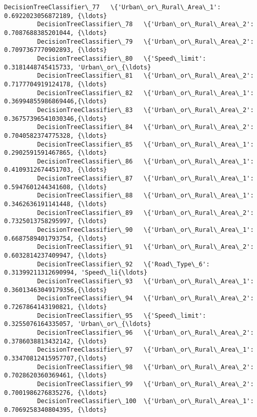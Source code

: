 \documentclass[11pt]{article}
\begin{document}
\begin{Verbatim}[commandchars=\\\{\}]
         DecisionTreeClassifier\_77   \{'Urban\_or\_Rural\_Area\_1': 0.6922023056872189, {\ldots}   
         DecisionTreeClassifier\_78   \{'Urban\_or\_Rural\_Area\_2': 0.7087688385201044, {\ldots}   
         DecisionTreeClassifier\_79   \{'Urban\_or\_Rural\_Area\_2': 0.7097367770902893, {\ldots}   
         DecisionTreeClassifier\_80   \{'Speed\_limit': 0.3181448745415733, 'Urban\_or\_{\ldots}   
         DecisionTreeClassifier\_81   \{'Urban\_or\_Rural\_Area\_2': 0.7177704919124178, {\ldots}   
         DecisionTreeClassifier\_82   \{'Urban\_or\_Rural\_Area\_1': 0.36994855986869446,{\ldots}   
         DecisionTreeClassifier\_83   \{'Urban\_or\_Rural\_Area\_2': 0.36757396541030346,{\ldots}   
         DecisionTreeClassifier\_84   \{'Urban\_or\_Rural\_Area\_2': 0.7040582374775328, {\ldots}   
         DecisionTreeClassifier\_85   \{'Urban\_or\_Rural\_Area\_1': 0.2902591591467865, {\ldots}   
         DecisionTreeClassifier\_86   \{'Urban\_or\_Rural\_Area\_1': 0.4109312674451703, {\ldots}   
         DecisionTreeClassifier\_87   \{'Urban\_or\_Rural\_Area\_1': 0.5947601244341608, {\ldots}   
         DecisionTreeClassifier\_88   \{'Urban\_or\_Rural\_Area\_1': 0.3462636191141448, {\ldots}   
         DecisionTreeClassifier\_89   \{'Urban\_or\_Rural\_Area\_2': 0.7325013758295997, {\ldots}   
         DecisionTreeClassifier\_90   \{'Urban\_or\_Rural\_Area\_1': 0.6687589401793754, {\ldots}   
         DecisionTreeClassifier\_91   \{'Urban\_or\_Rural\_Area\_2': 0.6032814237409947, {\ldots}   
         DecisionTreeClassifier\_92   \{'Road\_Type\_6': 0.31399211312690994, 'Speed\_li{\ldots}   
         DecisionTreeClassifier\_93   \{'Urban\_or\_Rural\_Area\_1': 0.36013463049179356,{\ldots}   
         DecisionTreeClassifier\_94   \{'Urban\_or\_Rural\_Area\_2': 0.7267864143190821, {\ldots}   
         DecisionTreeClassifier\_95   \{'Speed\_limit': 0.3255076164335057, 'Urban\_or\_{\ldots}   
         DecisionTreeClassifier\_96   \{'Urban\_or\_Rural\_Area\_2': 0.3786038813432142, {\ldots}   
         DecisionTreeClassifier\_97   \{'Urban\_or\_Rural\_Area\_1': 0.33470812415957707,{\ldots}   
         DecisionTreeClassifier\_98   \{'Urban\_or\_Rural\_Area\_2': 0.7028620360369461, {\ldots}   
         DecisionTreeClassifier\_99   \{'Urban\_or\_Rural\_Area\_2': 0.7001986276835276, {\ldots}   
         DecisionTreeClassifier\_100  \{'Urban\_or\_Rural\_Area\_1': 0.7069258340804395, {\ldots}   
         

\end{Verbatim}
\end{document}
